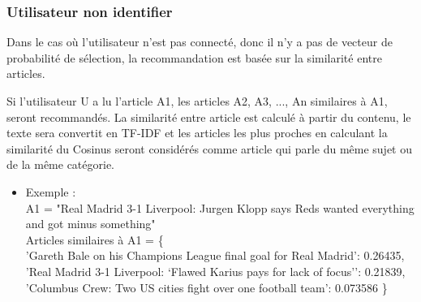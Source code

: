         \subsubsection{Utilisateur non identifier}
        Dans le cas où l'utilisateur n'est pas connecté, donc il n’y a pas de vecteur de probabilité de sélection, la recommandation est basée sur la similarité entre articles.

        Si l'utilisateur U a lu l'article A1, les articles A2, A3, ..., An similaires à A1, seront recommandés. La similarité entre article est calculé à partir du contenu, le texte sera convertit en TF-IDF et les articles les plus proches en calculant la similarité du Cosinus seront considérés comme article qui parle du même sujet ou de la même catégorie.

        \begin{itemize}[leftmargin=*]
            \item Exemple :\\ 
            A1 = "Real Madrid 3-1 Liverpool: Jurgen Klopp says Reds wanted everything and got minus something"\\
            Articles similaires à A1 = \{\\
                'Gareth Bale on his Champions League final goal for Real Madrid': 0.26435,\\
                'Real Madrid 3-1 Liverpool: ‘Flawed Karius pays for lack of focus’': 0.21839,\\
                'Columbus Crew: Two US cities fight over one football team': 0.073586
            \}
        \end{itemize} 

